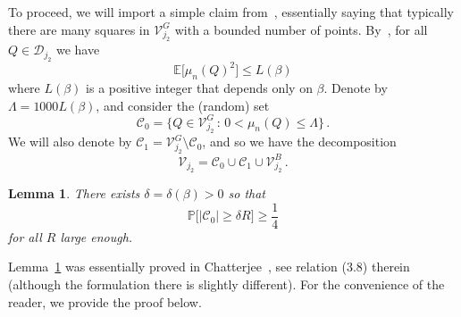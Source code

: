 \documentclass[11pt]{amsart}
\newtheorem{lemma}[theorem]{Lemma}
\theoremstyle{definition}
\theoremstyle{remark}
\numberwithin{equation}{section}
\def\La{{\Lambda}}
\newcommand{\bP}{\mathbb P}
\newcommand{\bE}{\mathbb E}
\begin{document}
	To proceed, we will import a simple claim from~\cite{chatterjee}, essentially saying that typically there are many squares in $\mathcal{V}_{j_2}^G$ with a bounded number of points. By~\cite[Lemma~3.8]{chatterjee}, for all $Q\in \mathcal{D}_{j_2}$ we have
	\[
	\bE\big[\mu_n(Q)^2\big] \le L(\beta)
	\]
	where $L(\beta)$ is a positive integer that depends only on $\beta$. Denote by $\La = 1000 L(\beta)$, and consider the (random) set
	\begin{equation*}
		\mathcal{C}_0 = \Big\{ Q\in \mathcal{V}_{j_2}^G \, : \, 0< \mu_n(Q) \le \La \Big\} \, .
	\end{equation*} 
	We will also denote by $\mathcal{C}_1 = \mathcal{V}_{j_2}^G \setminus \mathcal{C}_0$, and so we have the decomposition
	\begin{equation}
		\label{eq:decomposition_of_boundary_cubes}
		\mathcal{V}_{j_2} = \mathcal{C}_0 \cup \mathcal{C}_1 \cup \mathcal{V}_{j_2}^B \, .
	\end{equation}
	\begin{lemma}
		\label{lemma:moderate_deviations_lower_bound_lemma_from_chatterjee}
		There exists $\delta=\delta(\beta)>0$ so that 
		\[
		\bP\big[|\mathcal{C}_0| \ge \delta R\big] \ge \frac{1}{4}
		\]
		for all $R$ large enough.
	\end{lemma}
	Lemma~\ref{lemma:moderate_deviations_lower_bound_lemma_from_chatterjee} was essentially proved in Chatterjee~\cite{chatterjee}, see relation (3.8) therein (although the formulation there is slightly different). For the convenience of the reader, we provide the proof below.
\end{document}
